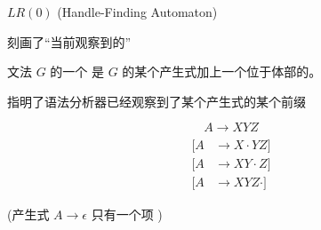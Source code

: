 \begin{frame}{}
  \begin{center}
    $LR(0)$  (Handle-Finding Automaton)

    \vspace{0.10cm}
  \end{center}
\end{frame}

%
%

%

\begin{frame}{}
  \begin{center}
    刻画了``当前观察到的''
  \end{center}

  \begin{definition}[$LR(0)$项 (Item)]
    文法 $G$ 的一个 是 $G$ 的某个产生式加上一个位于体部的。
  \end{definition}

  \begin{center}
    指明了语法分析器已经观察到了某个产生式的某个前缀

    \pause
    \[
      A \to XYZ
    \]
    \begin{align*}
      [A &\to \cdot XYZ] \\[6pt]
      [A &\to X \cdot YZ] \\[6pt]
      [A &\to XY \cdot Z] \\[6pt]
      [A &\to XYZ \cdot]
    \end{align*}

    (产生式 $A \to \epsilon$ 只有一个项 \blue{$[A \to \cdot]$})

  \end{center}
\end{frame}

